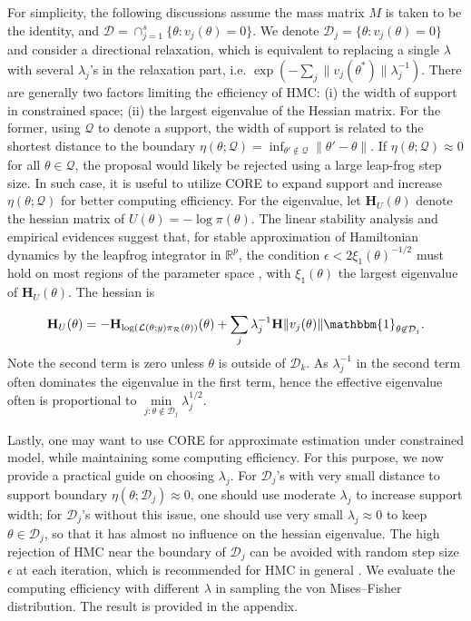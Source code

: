 \documentclass[10pt,fleqn]{article}
\newcommand{\bb}[1]{\mathbb{#1}} \newcommand{\mc}[1]{\mathcal{#1}}
\DeclareMathOperator{\1}{\mathbbm{1}} \DeclareMathOperator{\bigO}{\mc O}
\newcommand{\dt}{\epsilon} %
\newcommand{\mass}{M} %
\newcommand{\hess}{\mathbf{H}} %
\begin{document}
For simplicity, the following discussions assume the mass matrix $\mass$ is
taken to be the identity, and $\mc D= \cap_{j=1}^s\{\theta :v_j(\theta)=0 \}$.
We denote $\mc D_j= \{\theta :v_j(\theta)=0 \}$ and consider a directional
relaxation, which is equivalent to replacing a single $\lambda$ with several
$\lambda_j$'s in the relaxation part, i.e. $\exp(-\sum_j{\|v_j(\theta^*)\|}{\lambda_j^{-1}})$. There are generally two factors limiting the efficiency of HMC:
(i) the width of support in constrained space; (ii) the largest eigenvalue of the Hessian matrix.
For the former, using $\mc Q$ to denote a support, the width of support is related to the shortest
distance to the boundary $\eta (\theta; {\mc Q})= \inf_{\theta'\not\in \mc
Q}\|\theta'-\theta\|$. If $\eta (\theta; {\mc Q}) \approx 0$ for all $\theta\in \mc Q$,
the proposal would likely be rejected using a large leap-frog step size. In such case,
it is useful to utilize CORE to expand support and
increase $\eta (\theta; {\mc Q})$ for better computing efficiency. For the eigenvalue,
let $\hess_U(\theta)$ denote the hessian matrix of
$U(\theta) = - \log \pi(\theta)$.
The linear stability analysis and
empirical evidences suggest that, for stable approximation of Hamiltonian
dynamics by the leapfrog integrator in $\bb R^p$, the condition $\dt <
2\xi_1(\theta)^{-1/2}$ must hold on most regions of the parameter space
\citep{hairer06}, with $\xi_1(\theta)$ the largest
eigenvalue of $\hess_U(\theta)$. The hessian is

\begin{equation} \label{eq:hessian_extrinsic}
\hess_U(\theta) = -\hess_{\log
(\mathcal L(\theta;y) \pi_{\mc R}(\theta))
}(\theta)+\sum_j \lambda_j^{-1} \hess {\|v_j(\theta)\|}
\mathbbm{1}_{\theta\not\in \mc D_j}. \end{equation}
Note the second term is zero unless $\theta$ is outside of $\mc D_k$. As $\lambda^{-1}_j$ in the
second term often dominates the eigenvalue in the first term, hence the effective eigenvalue often is
proportional to $ \underset{j: \theta \not\in \mc D_j}{\min}\lambda_j^{1/2}$.

Lastly, one may want to use CORE for approximate estimation under constrained
model, while maintaining some computing efficiency.
For this purpose, we now provide a practical guide on choosing $\lambda_j$.  For $\mc
D_j$'s with very small distance to support boundary $\eta(\theta;\mc D_j)\approx 0$, one should use moderate $\lambda_j$
to increase support width;  for $\mc D_j$'s
without this issue, one should use very small $\lambda_j\approx 0$ to keep $\theta\in\mc D_j$, so that it has almost no influence on the hessian eigenvalue.
The high rejection of HMC near the boundary of $\mc D_j$ can be avoided with random step size $\epsilon$ at each iteration, which is recommended for HMC in general \citep{livingstone2016geometric}. We evaluate the computing efficiency with different $\lambda$ in sampling the von Mises--Fisher distribution. The result is provided in the appendix.
\end{document}
